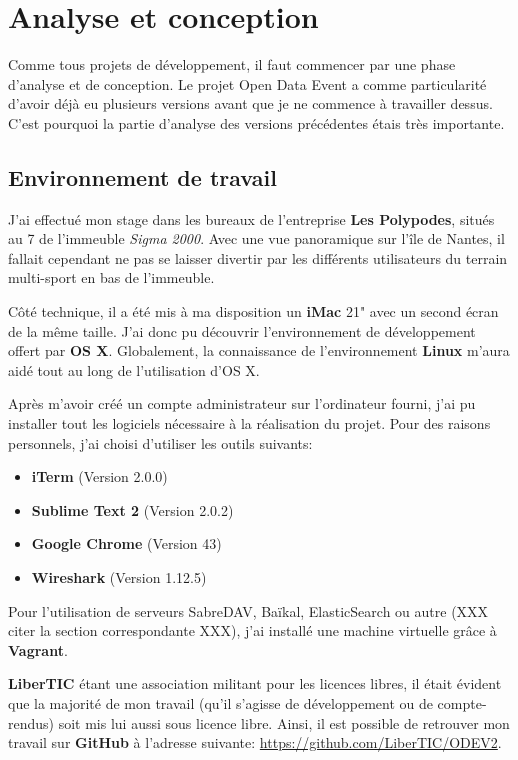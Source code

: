 \section{Analyse et conception}

Comme tous projets de développement, il faut commencer par une phase d'analyse et de conception. Le projet Open Data Event a comme particularité d'avoir déjà eu plusieurs versions avant que je ne commence à travailler dessus. C'est pourquoi la partie d'analyse des versions précédentes étais très importante.

\subsection{Environnement de travail}

J'ai effectué mon stage dans les bureaux de l'entreprise \textbf{Les Polypodes}, situés au 7 de l'immeuble \textit{Sigma 2000}. Avec une vue panoramique sur l'île de Nantes, il fallait cependant ne pas se laisser divertir par les différents utilisateurs du terrain multi-sport en bas de l'immeuble.

Côté technique, il a été mis à ma disposition un \textbf{iMac} 21" avec un second écran de la même taille. J'ai donc pu découvrir l'environnement de développement offert par \textbf{OS X}. Globalement, la connaissance de l'environnement \textbf{Linux} m'aura aidé tout au long de l'utilisation d'OS X.

Après m'avoir créé un compte administrateur sur l'ordinateur fourni, j'ai pu installer tout les logiciels nécessaire à la réalisation du projet. Pour des raisons personnels, j'ai choisi d'utiliser les outils suivants:

\begin{itemize}
    \item \textbf{iTerm} (Version 2.0.0)
    \item \textbf{Sublime Text 2} (Version 2.0.2)
    \item \textbf{Google Chrome} (Version 43)
    \item \textbf{Wireshark} (Version 1.12.5)
\end{itemize}

Pour l'utilisation de serveurs SabreDAV, Baïkal, ElasticSearch ou autre (XXX citer la section correspondante XXX), j'ai installé une machine virtuelle grâce à \textbf{Vagrant}.

\textbf{LiberTIC} étant une association militant pour les licences libres, il était évident que la majorité de mon travail (qu'il s'agisse de développement ou de compte-rendus) soit mis lui aussi sous licence libre. Ainsi, il est possible de retrouver mon travail sur \textbf{GitHub} à l'adresse suivante: \url{https://github.com/LiberTIC/ODEV2}.

